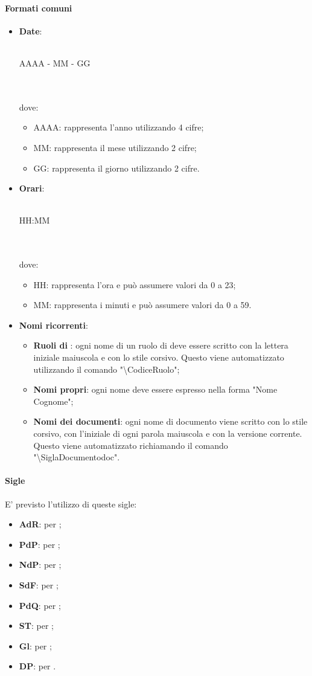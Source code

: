  \paragraph{Formati comuni}
\begin{itemize}
	\item \textbf{Date}:\\ \\ \centerline{AAAA - MM - GG} \\ \\
	dove:
	\begin{itemize}
		\item AAAA: rappresenta l'anno utilizzando 4 cifre;
		\item MM: rappresenta il mese utilizzando 2 cifre;
		\item GG: rappresenta il giorno utilizzando 2 cifre.
	\end{itemize}
	\item \textbf{Orari}:\\ \\ \centerline{HH:MM} \\ \\dove:
	\begin{itemize}
		\item HH: rappresenta l'ora e può assumere valori da 0 a 23;
		\item MM: rappresenta i minuti e può assumere valori da 0 a 59.
	\end{itemize}
	\item \textbf{Nomi ricorrenti}:
	\begin{itemize}
		\item \textbf{Ruoli di }: ogni nome di un ruolo di  deve essere scritto con la lettera iniziale maiuscola e con lo stile corsivo. Questo viene automatizzato utilizzando il comando "\textbackslash{CodiceRuolo}";
		\item \textbf{Nomi propri}: ogni nome deve essere espresso nella forma "Nome Cognome";
		\item \textbf{Nomi dei documenti}: ogni nome di documento viene scritto con lo stile corsivo, con l'iniziale di ogni parola maiuscola e con la versione corrente. Questo viene automatizzato richiamando il comando "\textbackslash{SiglaDocumentodoc}".
	\end{itemize}
\end{itemize}
 \paragraph{Sigle}
E' previsto l'utilizzo di queste sigle:
\begin{itemize}
	\item \textbf{AdR}: per \ARdoc;
	\item \textbf{PdP}: per \PPdoc;
	\item \textbf{NdP}: per \NPdoc;
	\item \textbf{SdF}: per \SFdoc;
	\item \textbf{PdQ}: per \PQdoc;
	\item \textbf{ST}: per \STdoc;
	\item \textbf{Gl}: per \Gldoc;
	\item \textbf{DP}: per \DPdoc.		
\end{itemize}
 
